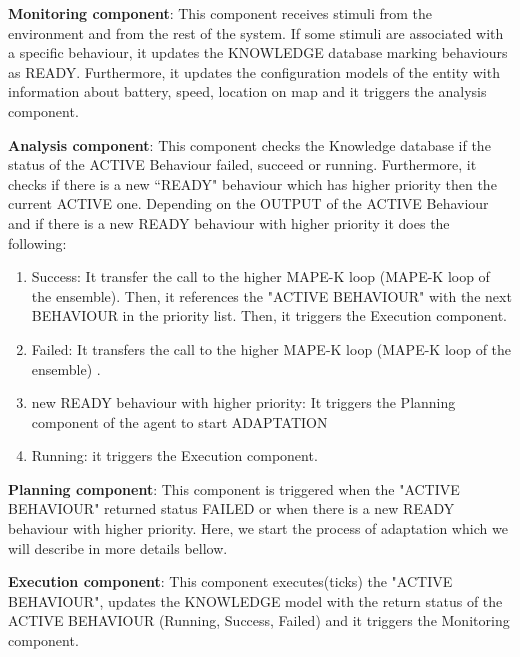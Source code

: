 \documentclass[journal]{IEEEtran}
\theoremstyle{definition}
\begin{document}
\textbf{Monitoring component}: This component receives stimuli from the environment and from the rest of the system. 
If some stimuli are associated with a specific behaviour, it updates the KNOWLEDGE database marking behaviours as READY.
Furthermore, it updates the configuration models of the entity with information about battery, speed, location on map and it triggers the analysis component.

\textbf{Analysis component}: This component checks the Knowledge database if the status of the ACTIVE Behaviour failed, succeed or running. Furthermore, it checks if there is a new ``READY" behaviour which has higher priority then the current ACTIVE one. Depending on the OUTPUT of the ACTIVE Behaviour and if there is a new READY behaviour with higher priority it does the following:
\begin{enumerate}

\item  Success: It transfer the call to the higher MAPE-K loop (MAPE-K loop of the ensemble). Then, it references the "ACTIVE BEHAVIOUR" with the next BEHAVIOUR in the priority list. Then, it triggers the Execution component.
\item Failed:  It transfers the call to the higher MAPE-K loop (MAPE-K loop of the ensemble) .
\item new READY behaviour with higher priority: It triggers the Planning component of the agent to start ADAPTATION
\item Running: it triggers the Execution component.
\end{enumerate}
 
\textbf{Planning component}: This component is triggered when the "ACTIVE BEHAVIOUR" returned status FAILED or when there is a new READY behaviour with higher priority. Here, we start the process of adaptation which we will describe in more details bellow.

\textbf{Execution component}: This component executes(ticks) the "ACTIVE BEHAVIOUR", updates the KNOWLEDGE model with the return status of the ACTIVE BEHAVIOUR (Running, Success, Failed) and it triggers the Monitoring component.
\end{document}
